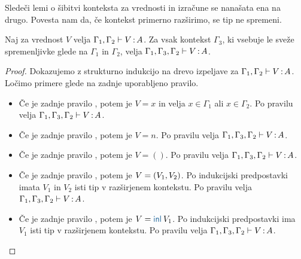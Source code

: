 Sledeči lemi o šibitvi konteksta za vrednosti in izračune se nanašata ena na drugo. Povesta nam da, če kontekst primerno razširimo, se tip ne spremeni.

\begin{lema}\label{lem:weakening-values}
	Naj za vrednost $V$ velja $\Gamma_1, \Gamma_2 \vdash V \mathinner{:} A$. Za vsak kontekst $\Gamma_3$, ki vsebuje le sveže spremenljivke glede na $\Gamma_1$ in $\Gamma_2$, velja $\Gamma_1, \Gamma_3, \Gamma_2 \vdash V \mathinner{:} A$.
\end{lema}

\begin{proof}
	Dokazujemo z strukturno indukcijo na drevo izpeljave za $\Gamma_1, \Gamma_2 \vdash V \mathinner{:} A$.
	Ločimo primere glede na zadnje uporabljeno pravilo.
	
	\begin{itemize}
		\item[\sitem] Če je zadnje pravilo , potem je $V = x$ in velja $x \in \Gamma_1$ ali $x \in \Gamma_2$. Po pravilu  velja $\Gamma_1, \Gamma_3, \Gamma_2 \vdash V \mathinner{:} A$.
		
		\item Če je zadnje pravilo , potem je $V = n$. Po pravilu  velja $\Gamma_1, \Gamma_3, \Gamma_2 \vdash V \mathinner{:} A$.
		
		\item Če je zadnje pravilo , potem je $V = ()$. Po pravilu  velja $\Gamma_1, \Gamma_3, \Gamma_2 \vdash V \mathinner{:} A$.
		
		\item Če je zadnje pravilo , potem je $V =( V_1 , V_2 )$. Po indukcijski predpostavki imata $V_1$ in $V_2$ isti tip v razširjenem kontekstu.
		Po pravilu  velja $\Gamma_1, \Gamma_3, \Gamma_2 \vdash V \mathinner{:} A$.
		
		\item Če je zadnje pravilo , potem je $V = \tminl{V_1}$. Po indukcijski predpostavki ima $V_1$ isti tip v razširjenem kontekstu.
		Po pravilu  velja $\Gamma_1, \Gamma_3, \Gamma_2 \vdash V \mathinner{:} A$.
		

\end{itemize}
\end{proof}
